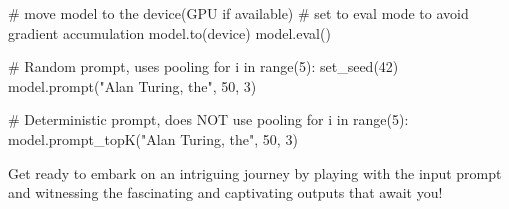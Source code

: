 \begin{exercise}
\begin{exercise}
\begin{python}
# move model to the device(GPU if available)
# set to eval mode to avoid gradient accumulation
model.to(device)
model.eval()

# Random prompt, uses pooling
for i in range(5):
    set_seed(42)
    model.prompt("Alan Turing, the", 50, 3)

# Deterministic prompt, does NOT use pooling
for i in range(5):
    model.prompt_topK("Alan Turing, the", 50, 3)
\end{python}

Get ready to embark on an intriguing journey by playing with the input prompt and witnessing the fascinating and captivating outputs that await you!

\end{exercise}

\end{exercise}